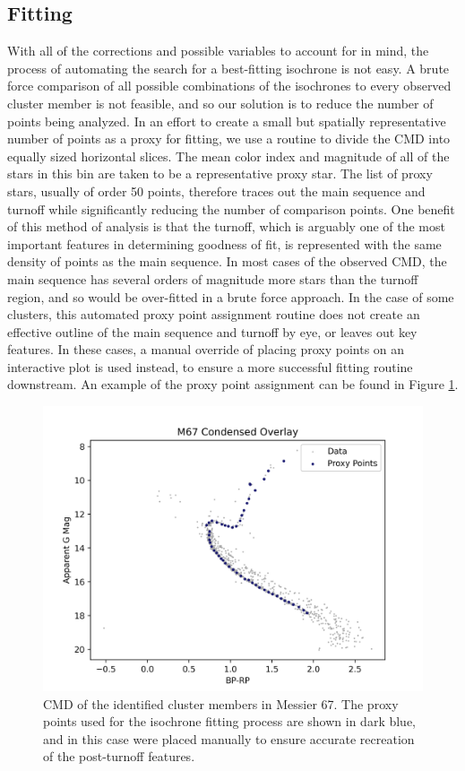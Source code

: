 \documentclass[onecolumn,table,xcdraw,super]{aastex631}
\begin{document}
\subsection{Fitting} \label{sec:fit}
With all of the corrections and possible variables to account for in mind, the process of automating the search for a best-fitting isochrone is not easy. A brute force comparison of all possible combinations of the isochrones to every observed cluster member is not feasible, and so our solution is to reduce the number of points being analyzed. In an effort to create a small but spatially representative number of points as a proxy for fitting, we use a routine to divide the CMD into equally sized horizontal slices. The mean color index and magnitude of all of the stars in this bin are taken to be a representative proxy star. The list of proxy stars, usually of order 50 points, therefore traces out the main sequence and turnoff while significantly reducing the number of comparison points. One benefit of this method of analysis is that the turnoff, which is arguably one of the most important features in determining goodness of fit, is represented with the same density of points as the main sequence. In most cases of the observed CMD, the main sequence has several orders of magnitude more stars than the turnoff region, and so would be over-fitted in a brute force approach. In the case of some clusters, this automated proxy point assignment routine does not create an effective outline of the main sequence and turnoff by eye, or leaves out key features. In these cases, a manual override of placing proxy points on an interactive plot is used instead, to ensure a more successful fitting routine downstream. An example of the proxy point assignment can be found in Figure \ref{fig:M67_cmd_proxy}.

\begin{figure}[]
    \centering
      \includegraphics[width=4.75in]{figures/M67_condensed_CMD_overlay.png}
    \caption{CMD of the identified cluster members in Messier 67. The proxy points used for the isochrone fitting process are shown in dark blue, and in this case were placed manually to ensure accurate recreation of the post-turnoff features.}
    \label{fig:M67_cmd_proxy}
\end{figure}
\end{document}
